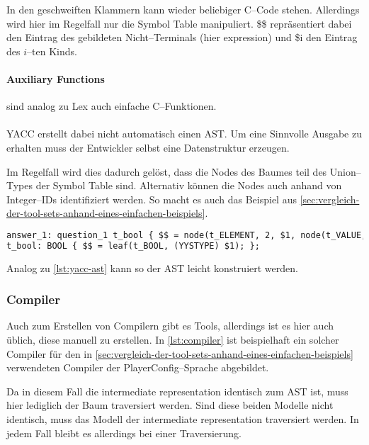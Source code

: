 In den geschweiften Klammern kann wieder beliebiger C--Code stehen.
Allerdings wird hier im Regelfall nur die Symbol Table manipuliert.
{\ttfamily \$\$} repräsentiert dabei den Eintrag des gebildeten Nicht--Terminals (hier {\ttfamily expression}) und {\ttfamily \$i} den Eintrag des $i$--ten Kinds.

\paragraph{Auxiliary Functions} sind analog zu Lex auch einfache C--Funktionen.

\paragraph*{}
\ac{YACC} erstellt dabei nicht automatisch einen \ac{AST}.
Um eine Sinnvolle Ausgabe zu erhalten muss der Entwickler selbst eine Datenstruktur erzeugen.

Im Regelfall wird dies dadurch gelöst, dass die Nodes des Baumes teil des Union--Types der Symbol Table sind.
Alternativ können die Nodes auch anhand von Integer--IDs identifiziert werden.
So macht es auch das Beispiel aus \autoref{sec:vergleich-der-tool-sets-anhand-eines-einfachen-beispiels}.
\begin{lstlisting}[label={lst:yacc-ast},caption={\acs{YACC} \acs{AST}},language=yacc]
answer_1: question_1 t_bool { $$ = node(t_ELEMENT, 2, $1, node(t_VALUE, 1, $2)); };
t_bool: BOOL { $$ = leaf(t_BOOL, (YYSTYPE) $1); };
\end{lstlisting}
Analog zu \autoref{lst:yacc-ast} kann so der \ac{AST} leicht konstruiert werden.

\subsubsection{Compiler}
Auch zum Erstellen von Compilern gibt es Tools, allerdings ist es hier auch üblich, diese manuell zu erstellen.
In \autoref{lst:compiler} ist beispielhaft ein solcher Compiler für den in \autoref{sec:vergleich-der-tool-sets-anhand-eines-einfachen-beispiels} verwendeten Compiler der PlayerConfig--Sprache abgebildet.

Da in diesem Fall die intermediate representation identisch zum \ac{AST} ist, muss hier lediglich der Baum traversiert werden.
Sind diese beiden Modelle nicht identisch, muss das Modell der intermediate representation traversiert werden.
In jedem Fall bleibt es allerdings bei einer Traversierung.

